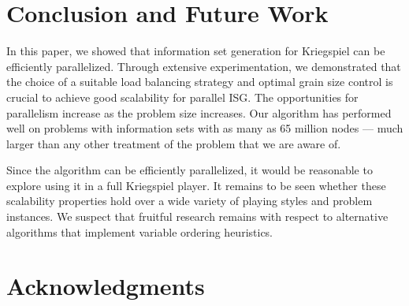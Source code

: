 \documentclass[10pt, conference, compsocconf]{IEEEtran}
\begin{document}
%

\section{Conclusion and Future Work}
In this paper, we showed that information set generation for Kriegspiel can be efficiently
parallelized.  Through extensive experimentation, we demonstrated that the choice of a suitable load balancing strategy and optimal grain size control is crucial to achieve good scalability for parallel ISG. The opportunities for parallelism increase as the problem size
increases.  Our algorithm has performed well on problems with information sets
with as many as 65 million nodes --- much larger than any other treatment of the
problem that we are aware of.  

Since the algorithm can be efficiently
parallelized, it would be reasonable to explore using it in a full Kriegspiel
player.  It remains to be seen whether these scalability properties hold over a
wide variety of playing styles and problem instances.  We suspect that fruitful
research remains with respect to alternative algorithms that implement variable
ordering heuristics.

\section*{Acknowledgments}
\end{document}
